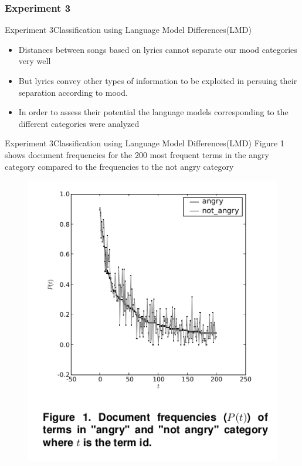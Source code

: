 \documentclass{beamer}
\begin{document}
\subsubsection{Experiment 3}
\begin{frame}{Experiment 3}{Classification using Language Model Differences(LMD)}

 
  \begin{itemize}
  
  \item 
  {
  	 Distances between songs based on lyrics cannot separate our mood categories very well
  }
  \item
  {
  	But lyrics convey other types of information to be exploited in persuing their separation according to mood.
  }
  \item {
     In order to assess their potential the language models corresponding to the different categories were analyzed 
  }
  
  
  \end{itemize}
\end{frame}


\begin{frame}{Experiment 3}{Classification using Language Model Differences(LMD)}
{\small Figure 1 shows document frequencies for the 200 most frequent terms in the angry category compared to the frequencies to the not angry category}
\begin{figure}
\centering
\includegraphics[scale = 0.28]{graph1}
\end{figure} 

\end{frame}
\end{document}

